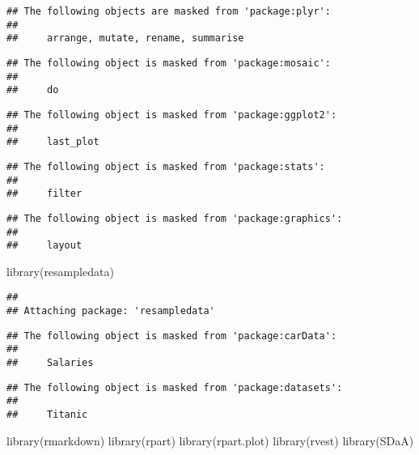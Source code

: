 \documentclass[
]{article}
\newenvironment{Shaded}{\begin{snugshade}}{\end{snugshade}}
\newcommand{\FunctionTok}[1]{\textcolor[rgb]{0.00,0.00,0.00}{#1}}
\newcommand{\NormalTok}[1]{#1}
\begin{document}
\begin{verbatim}
## The following objects are masked from 'package:plyr':
## 
##     arrange, mutate, rename, summarise
\end{verbatim}

\begin{verbatim}
## The following object is masked from 'package:mosaic':
## 
##     do
\end{verbatim}

\begin{verbatim}
## The following object is masked from 'package:ggplot2':
## 
##     last_plot
\end{verbatim}

\begin{verbatim}
## The following object is masked from 'package:stats':
## 
##     filter
\end{verbatim}

\begin{verbatim}
## The following object is masked from 'package:graphics':
## 
##     layout
\end{verbatim}

\begin{Shaded}
\begin{Highlighting}[]
\FunctionTok{library}\NormalTok{(resampledata)}
\end{Highlighting}
\end{Shaded}

\begin{verbatim}
## 
## Attaching package: 'resampledata'
\end{verbatim}

\begin{verbatim}
## The following object is masked from 'package:carData':
## 
##     Salaries
\end{verbatim}

\begin{verbatim}
## The following object is masked from 'package:datasets':
## 
##     Titanic
\end{verbatim}

\begin{Shaded}
\begin{Highlighting}[]
\FunctionTok{library}\NormalTok{(rmarkdown)}
\FunctionTok{library}\NormalTok{(rpart)}
\FunctionTok{library}\NormalTok{(rpart.plot)}
\FunctionTok{library}\NormalTok{(rvest)}
\FunctionTok{library}\NormalTok{(SDaA)}
\end{Highlighting}
\end{Shaded}
\end{document}
